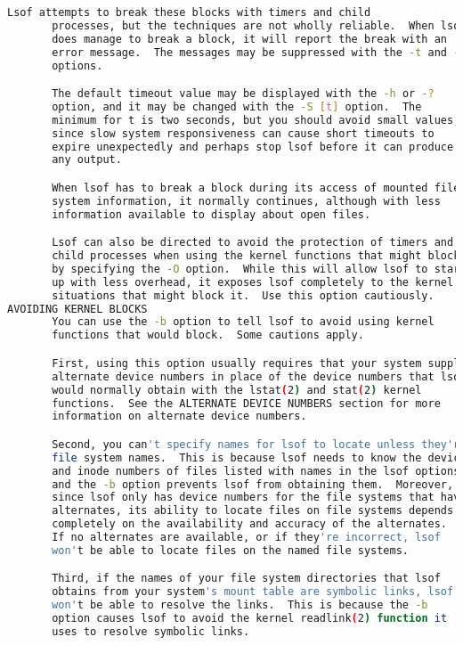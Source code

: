 {{\begin{lstlisting}[language=bash]
       Lsof attempts to break these blocks with timers and child
       processes, but the techniques are not wholly reliable.  When lsof
       does manage to break a block, it will report the break with an
       error message.  The messages may be suppressed with the -t and -w
       options.

       The default timeout value may be displayed with the -h or -?
       option, and it may be changed with the -S [t] option.  The
       minimum for t is two seconds, but you should avoid small values,
       since slow system responsiveness can cause short timeouts to
       expire unexpectedly and perhaps stop lsof before it can produce
       any output.

       When lsof has to break a block during its access of mounted file
       system information, it normally continues, although with less
       information available to display about open files.

       Lsof can also be directed to avoid the protection of timers and
       child processes when using the kernel functions that might block
       by specifying the -O option.  While this will allow lsof to start
       up with less overhead, it exposes lsof completely to the kernel
       situations that might block it.  Use this option cautiously.
AVOIDING KERNEL BLOCKS
       You can use the -b option to tell lsof to avoid using kernel
       functions that would block.  Some cautions apply.

       First, using this option usually requires that your system supply
       alternate device numbers in place of the device numbers that lsof
       would normally obtain with the lstat(2) and stat(2) kernel
       functions.  See the ALTERNATE DEVICE NUMBERS section for more
       information on alternate device numbers.

       Second, you can't specify names for lsof to locate unless they're
       file system names.  This is because lsof needs to know the device
       and inode numbers of files listed with names in the lsof options,
       and the -b option prevents lsof from obtaining them.  Moreover,
       since lsof only has device numbers for the file systems that have
       alternates, its ability to locate files on file systems depends
       completely on the availability and accuracy of the alternates.
       If no alternates are available, or if they're incorrect, lsof
       won't be able to locate files on the named file systems.

       Third, if the names of your file system directories that lsof
       obtains from your system's mount table are symbolic links, lsof
       won't be able to resolve the links.  This is because the -b
       option causes lsof to avoid the kernel readlink(2) function it
       uses to resolve symbolic links.


\end{lstlisting}}}
